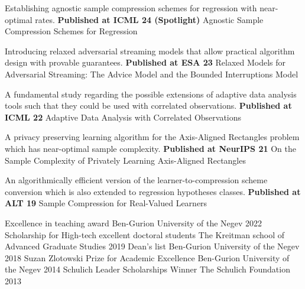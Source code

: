 \documentclass[]{awesome-cv}
\begin{document}
\begin{cventries}
	\cventry
	{Establishing agnostic sample compression schemes for regression with near-optimal rates. \textbf{Published at ICML 24 (Spotlight)}}
	{Agnostic Sample Compression Schemes for Regression}
	{}
	{}
	{}

	\vspace{-5mm}
	\cventry
	{Introducing relaxed adversarial streaming models that allow practical algorithm design with provable guarantees. \textbf{Published at ESA 23}}
	{Relaxed Models for Adversarial Streaming: The Advice Model and the Bounded Interruptions Model}
	{}
	{}
	{}

	\vspace{-5mm}
	\cventry
	{A fundamental study regarding the possible extensions of adaptive data analysis tools such that they could be used with correlated observations. \textbf{Published at ICML 22}}
	{Adaptive Data Analysis with Correlated Observations}
	{}
	{%
    }
	{}
	
	\vspace{-5mm}
	\cventry
	{A privacy preserving learning algorithm for the Axis-Aligned Rectangles problem which has near-optimal sample complexity. \textbf{Published at NeurIPS 21}}
	{On the Sample Complexity of Privately Learning Axis-Aligned Rectangles}
	{}
	{%
    }
	{}
	
	\vspace{-5mm}
	\cventry
	{An algorithmically efficient version of the learner-to-compression scheme conversion which is also extended to regression hypotheses classes. \textbf{Published at ALT 19}}
	{Sample Compression for Real-Valued Learners}
	{}
	{%
    }
	{}
\end{cventries}
\vspace{-6mm}	
\begin{cvhonors}
	\cvhonor
	{Excellence in teaching award}
	{\scriptsize{Ben-Gurion University of the Negev}}
	{}
	{2022}
	\cvhonor
	{Scholarship for High-tech excellent doctoral students}
	{\scriptsize{The Kreitman school of Advanced Graduate Studies}}
	{}
	{2019}
	\cvhonor
	{Dean’s list}
	{\scriptsize{Ben-Gurion University of the Negev}}
	{}
	{2018}	
	\cvhonor
	{Suzan Zlotowski Prize for Academic Excellence}
	{\scriptsize{Ben-Gurion University of the Negev}}
	{}
	{2014}	
	\cvhonor
	{Schulich Leader Scholarships Winner}
	{\scriptsize{The Schulich Foundation}}
	{}
	{2013}	
\end{cvhonors}
\end{document}
